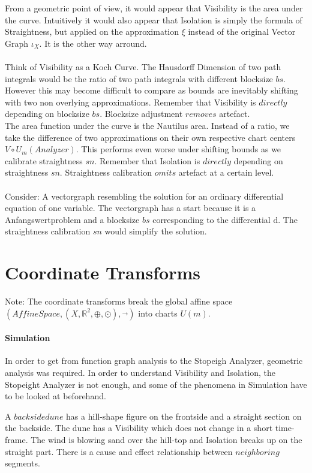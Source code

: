 \documentclass{report}
\begin{document}
From a geometric point of view, it would appear that Visibility is the area under the curve. Intuitively it would also appear that Isolation is simply the formula of Straightness, but applied on the approximation $\xi$ instead of the original Vector Graph $\iota_{X}$. It is the other way arround.\\\\
Think of Visibility as a Koch Curve. The Hausdorff Dimension of two path integrals would be the ratio of two path integrals with different blocksize $bs$. However this may become difficult to compare as bounds are inevitably shifting with two non overlying approximations. Remember that Visibility is $directly$ depending on blocksize $bs$. Blocksize adjustment $removes$ artefact.\\
The area function under the curve is the Nautilus area. Instead of a ratio, we take the difference of two approximations on their own respective chart centers $V\circ U_{m}(Analyzer)$. This performs even worse under shifting bounds as we calibrate straightness $sn$. Remember that Isolation is $directly$ depending on straightness $sn$. Straightness calibration $omits$ artefact at a certain level.\\\\
Consider: A vectorgraph resembling the solution for an ordinary differential equation of one variable. The vectorgraph has a start because it is a Anfangswertproblem and a blocksize $bs$ corresponding to the differential $\mathrm{d}$. The straightness calibration $sn$ would simplify the solution.

\chapter{Coordinate Transforms}

Note: The coordinate transforms break the global affine space $(AffineSpace,(X,\mathbb{R}^2,\oplus,\odot),\overrightarrow{\text{ }})$ into charts $U(m)$.

\subsubsection*{Simulation}
In order to get from function graph analysis to the Stopeigh Analyzer, geometric analysis was required. In order to understand Visibility and Isolation, the Stopeight Analyzer is not enough, and some of the phenomena in Simulation have to be looked at beforehand.

A $backside dune$ has a hill-shape figure on the frontside and a straight section on the backside. The dune has a Visibility which does not change in a short time-frame. The wind is blowing sand over the hill-top and Isolation breaks up on the straight part. There is a cause and effect relationship between $neighboring$ segments.
\end{document}
